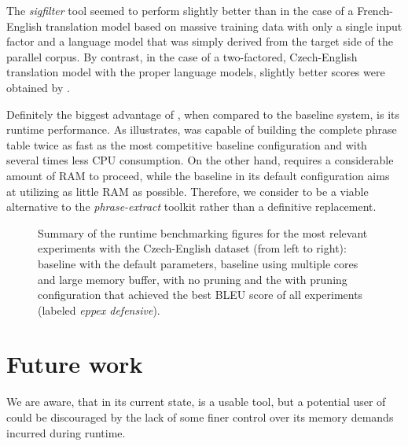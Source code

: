 The \emph{sigfilter} tool seemed to perform slightly better than \eppex{}
in the case of a French-English translation model based on massive training
data with only a single input factor and a language model that was simply
derived from the target side of the parallel corpus.
By contrast, in the case of a two-factored, Czech-English translation model with
the proper language models, slightly better scores were obtained by \eppex{}.

Definitely the biggest advantage of \eppex{}, when compared to the baseline
system, is its runtime performance.
As  illustrates, \eppex{} was capable of building
the complete phrase table twice as fast as the most competitive baseline
configuration and with several times less CPU consumption.
On the other hand, \eppex{} requires a considerable amount of RAM to proceed,
while the baseline in its default configuration aims at utilizing as little RAM
as possible.
Therefore, we consider \eppex{} to be a viable alternative to the \emph{phrase-extract}
toolkit rather than a definitive replacement.

\begin{figure}[!htb]
  \centering
  
  \caption{
    Summary of the runtime benchmarking figures for the most relevant experiments
    with the Czech-English dataset (from left to right): baseline with the default
    parameters, baseline using multiple cores and large memory buffer, \eppex{}
    with no pruning and the \eppex{} with pruning configuration that achieved the best
    BLEU score of all experiments (labeled \emph{eppex defensive}).
  }
  \label{fig:conclusions-cs-en}
\end{figure}

\section{Future work}

We are aware, that in its current state, \eppex{} is a usable tool,
but a potential user of \eppex{} could be discouraged by the lack of some
finer control over its memory demands incurred during
runtime.


